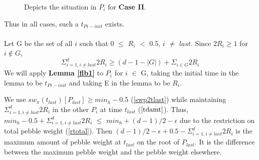\documentclass[12pt]{article}
\begin{document}
\begin{figure}[H]
  \centering
{}
\caption{Depicts the situation in $P_i$ for {\bf Case II}.}
\end{figure}


Thus in all cases, such a $t_{Pi-init}$ exists.\\\\




Let G be the set of all $i$ such that 0 ${\leq}$ $R_i$ ${<}$ 0.5, $i$ $\ne$ $last$. Since $2R_i \geq 1$ for $i \notin G$,
\begin{equation} \Sigma_{i=1, i \ne last}^d 2R_i \geq  (d-1-|G|) + \Sigma_{i \in G} 2R_i\label{GtonotG}\end{equation}
We will apply {\bf Lemma \ref{flb1}} to $P_i$ for $i$ $\in$ G, taking the initial time in the lemma to be $t_{Pi-init}$ and taking E in the lemma to be ${R_i}$.

We use $sw_{\pi}(t_{last})[P_{last}] \geq min_h-0.5$ (\ref{swp2tlast}) while maintaining $\Sigma_{i=1, i \ne last}^d 2R_i$ in the other $P_i$ at time $t_{last}$ ($\ref{tdamt}$). Thus, $min_h-0.5 + \Sigma_{i=1, i \ne last}^d 2R_i$ $\leq$ $min_h+(d-1)/2 -\epsilon$ due to the restriction on total pebble weight (\ref{rtotal}). Then
$(d-1)/2 -\epsilon +0.5- \Sigma_{i=1, i \ne last}^d 2R_i$ is the maximum amount of pebble weight at $t_{last}$ on the root of $P_{last}$. It is the difference between the maximum pebble weight and the pebble weight elsewhere.
\end{document}
